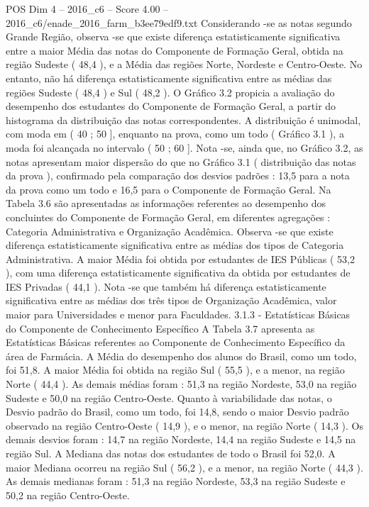 \begin{textsample}{POS Dim 4 – 2016\_c6 – Score 4.00 – 2016\_c6/enade\_2016\_farm\_b3ee79edf9.txt}
Considerando -se as notas segundo Grande Região, observa -se que existe diferença estatisticamente significativa entre a maior Média das notas do Componente de Formação Geral, obtida na região Sudeste ( 48,4 ), e a Média das regiões Norte, Nordeste e Centro-Oeste.
No entanto, não há diferença estatisticamente significativa entre as médias das regiões Sudeste ( 48,4 ) e Sul ( 48,2 ).
O Gráfico 3.2 propicia a avaliação do desempenho dos estudantes do Componente de Formação Geral, a partir do histograma da distribuição das notas correspondentes.
A distribuição é unimodal, com moda em ( 40 ; 50 ], enquanto na prova, como um todo ( Gráfico 3.1 ), a moda foi alcançada no intervalo ( 50 ; 60 ].
Nota -se, ainda que, no Gráfico 3.2, as notas apresentam maior dispersão do que no Gráfico 3.1 ( distribuição das notas da prova ), confirmado pela comparação dos desvios padrões : 13,5 para a nota da prova como um todo e 16,5 para o Componente de Formação Geral.
Na Tabela 3.6 são apresentadas as informações referentes ao desempenho dos concluintes do Componente de Formação Geral, em diferentes agregações : Categoria Administrativa e Organização Acadêmica.
Observa -se que existe diferença estatisticamente significativa entre as médias dos tipos de Categoria Administrativa.
A maior Média foi obtida por estudantes de IES Públicas ( 53,2 ), com uma diferença estatisticamente significativa da obtida por estudantes de IES Privadas ( 44,1 ).
Nota -se que também há diferença estatisticamente significativa entre as médias dos três tipos de Organização Acadêmica, valor maior para Universidades e menor para Faculdades. 3.1.3 - Estatísticas Básicas do Componente de Conhecimento Específico A Tabela 3.7 apresenta as Estatísticas Básicas referentes ao Componente de Conhecimento Específico da área de Farmácia.
A Média do desempenho dos alunos do Brasil, como um todo, foi 51,8.
A maior Média foi obtida na região Sul ( 55,5 ), e a menor, na região Norte ( 44,4 ).
As demais médias foram : 51,3 na região Nordeste, 53,0 na região Sudeste e 50,0 na região Centro-Oeste.
Quanto à variabilidade das notas, o Desvio padrão do Brasil, como um todo, foi 14,8, sendo o maior Desvio padrão observado na região Centro-Oeste ( 14,9 ), e o menor, na região Norte ( 14,3 ).
Os demais desvios foram : 14,7 na região Nordeste, 14,4 na região Sudeste e 14,5 na região Sul.
A Mediana das notas dos estudantes de todo o Brasil foi 52,0.
A maior Mediana ocorreu na região Sul ( 56,2 ), e a menor, na região Norte ( 44,3 ).
As demais medianas foram : 51,3 na região Nordeste, 53,3 na região Sudeste e 50,2 na região Centro-Oeste.

\end{textsample}

